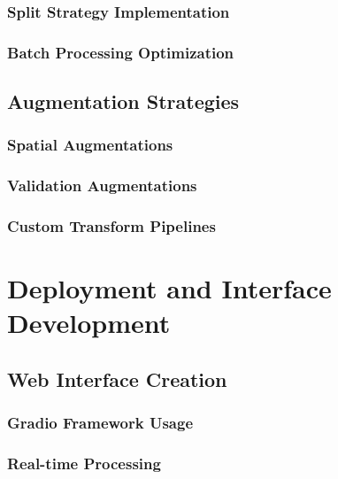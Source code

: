 \documentclass[12pt,a4paper]{report}
\begin{document}
\subsubsection{Split Strategy Implementation}

\subsubsection{Batch Processing Optimization}

\subsection{Augmentation Strategies}

\subsubsection{Spatial Augmentations}

\subsubsection{Validation Augmentations}

\subsubsection{Custom Transform Pipelines}

\section{Deployment and Interface Development}

\subsection{Web Interface Creation}

\subsubsection{Gradio Framework Usage}

\subsubsection{Real-time Processing}
\end{document}
